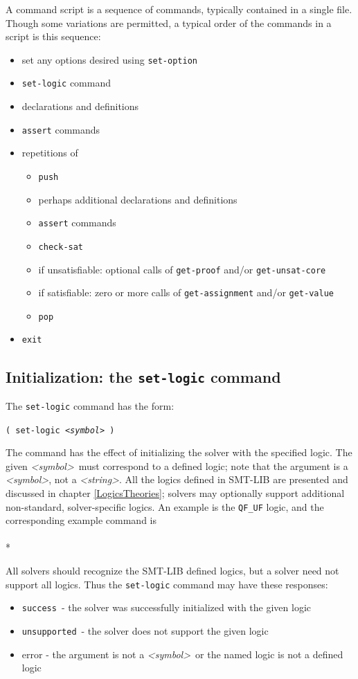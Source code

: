\documentclass[12pt,oneside]{report}
\newcommand{\success}{{\tt success}}
\newcommand{\unsupported}{{\tt unsupported}}
\newcommand{\sym}{{\it <symbol>}}
\newcommand{\strng}{{\it <string>}} %
\newcommand{\boxspace}{\vspace*{6pt}}
\newcommand{\boxedexample}[1]{\boxspace \\ \fbox{\parbox{6.30in}{\tt #1}}\boxspace\\*}
\newcommand{\nospace}{\setlength{\itemsep}{0in}\setlength{\parsep}{0in}\setlength{\parskip}{0in}\setlength{\topsep}{0in}}
\begin{document}
A command script is a sequence of commands, typically contained in a single file. Though some variations are permitted, a typical order
of the commands in a script is this sequence:
\begin{itemize} \nospace
\item set any options desired using {\tt set-option}
\item {\tt set-logic} command
\item declarations and definitions
\item {\tt assert} commands
\item repetitions of
\begin{itemize} \nospace
\item {\tt push}
\item perhaps additional declarations and definitions
\item {\tt assert} commands
\item {\tt check-sat}
\item if unsatisfiable: optional calls of {\tt get-proof} and/or {\tt get-unsat-core}
\item if satisfiable: zero or more calls of {\tt get-assignment} and/or {\tt get-value}
\item {\tt pop}
\end{itemize}
\item {\tt exit}
\end{itemize}


\pagebreak
\subsection{Initialization: the {\tt set-logic} command}

The {\tt set-logic} command has the form: \\
\centerline{\tt ( set-logic \sym\ ) } 
 
The command has the effect of initializing the solver with the specified logic.  The given \sym~must correspond to a defined logic; note that the argument is a \sym, not a \strng.  All the logics defined in SMT-LIB are presented and discussed
in chapter \ref{LogicsTheories}; solvers may optionally support additional non-standard, solver-specific logics.  An example is the {\tt QF\_UF} logic, and the corresponding example command is 
\boxedexample{
> ( set-logic QF\_UF ) \\
success
}

All solvers should recognize the SMT-LIB defined logics, but a solver need not support all logics.  Thus the {\tt set-logic} command may have these responses:
\begin{itemize} \nospace
\item \success~- the solver was successfully initialized with the given logic
\item \unsupported~- the solver does not support the given logic
\item error - the argument is not a \sym~or the named logic is not a defined logic
\end{itemize}
\end{document}
